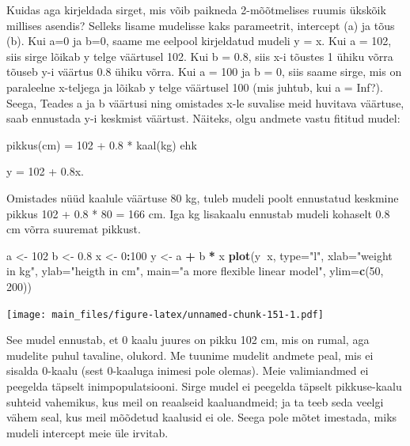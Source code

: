\documentclass[]{book}
\newenvironment{Shaded}{\begin{snugshade}}{\end{snugshade}}
\newcommand{\KeywordTok}[1]{\textcolor[rgb]{0.13,0.29,0.53}{\textbf{#1}}}
\newcommand{\DataTypeTok}[1]{\textcolor[rgb]{0.13,0.29,0.53}{#1}}
\newcommand{\DecValTok}[1]{\textcolor[rgb]{0.00,0.00,0.81}{#1}}
\newcommand{\FloatTok}[1]{\textcolor[rgb]{0.00,0.00,0.81}{#1}}
\newcommand{\StringTok}[1]{\textcolor[rgb]{0.31,0.60,0.02}{#1}}
\newcommand{\OperatorTok}[1]{\textcolor[rgb]{0.81,0.36,0.00}{\textbf{#1}}}
\newcommand{\NormalTok}[1]{#1}
\begin{document}
Kuidas aga kirjeldada sirget, mis võib paikneda 2-mõõtmelises ruumis
ükskõik millises asendis? Selleks lisame mudelisse kaks parameetrit,
intercept (a) ja tõus (b). Kui a=0 ja b=0, saame me eelpool kirjeldatud
mudeli y = x. Kui a = 102, siis sirge lõikab y telge väärtusel 102. Kui
b = 0.8, siis x-i tõustes 1 ühiku võrra tõuseb y-i väärtus 0.8 ühiku
võrra. Kui a = 100 ja b = 0, siis saame sirge, mis on paraleelne
x-teljega ja lõikab y telge väärtusel 100 (mis juhtub, kui a = Inf?).
Seega, Teades a ja b väärtusi ning omistades x-le suvalise meid huvitava
väärtuse, saab ennustada y-i keskmist väärtust. Näiteks, olgu andmete
vastu fititud mudel:

pikkus(cm) = 102 + 0.8 * kaal(kg) ehk

y = 102 + 0.8x.

Omistades nüüd kaalule väärtuse 80 kg, tuleb mudeli poolt ennustatud
keskmine pikkus 102 + 0.8 * 80 = 166 cm. Iga kg lisakaalu ennustab
mudeli kohaselt 0.8 cm võrra suuremat pikkust.

\begin{Shaded}
\begin{Highlighting}[]
\NormalTok{a <-}\StringTok{ }\DecValTok{102}
\NormalTok{b <-}\StringTok{ }\FloatTok{0.8}
\NormalTok{x <-}\StringTok{  }\DecValTok{0}\OperatorTok{:}\DecValTok{100} 
\NormalTok{y <-}\StringTok{  }\NormalTok{a }\OperatorTok{+}\StringTok{ }\NormalTok{b }\OperatorTok{*}\StringTok{ }\NormalTok{x}
\KeywordTok{plot}\NormalTok{(y}\OperatorTok{~}\NormalTok{x, }\DataTypeTok{type=}\StringTok{"l"}\NormalTok{, }\DataTypeTok{xlab=}\StringTok{"weight in kg"}\NormalTok{, }\DataTypeTok{ylab=}\StringTok{"heigth in cm"}\NormalTok{, }\DataTypeTok{main=}\StringTok{"a more flexible linear model"}\NormalTok{, }\DataTypeTok{ylim=}\KeywordTok{c}\NormalTok{(}\DecValTok{50}\NormalTok{, }\DecValTok{200}\NormalTok{))}
\end{Highlighting}
\end{Shaded}

\texttt{[image: main\_files/figure-latex/unnamed-chunk-151-1.pdf]}

See mudel ennustab, et 0 kaalu juures on pikku 102 cm, mis on rumal, aga
mudelite puhul tavaline, olukord. Me tuunime mudelit andmete peal, mis
ei sisalda 0-kaalu (sest 0-kaaluga inimesi pole olemas). Meie
valimiandmed ei peegelda täpselt inimpopulatsiooni. Sirge mudel ei
peegelda täpselt pikkuse-kaalu suhteid vahemikus, kus meil on reaalseid
kaaluandmeid; ja ta teeb seda veelgi vähem seal, kus meil mõõdetud
kaalusid ei ole. Seega pole mõtet imestada, miks mudeli intercept meie
üle irvitab.
\end{document}
